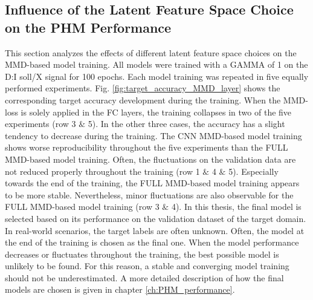 \subsection{Influence of the Latent Feature Space Choice on the PHM Performance}\label{ch:Influence_Layer_real_dataset}
This section analyzes the effects of different latent feature space choices on the MMD-based model training. All models were trained with a GAMMA of 1 on the D:I soll/X signal for 100 epochs. Each model training was repeated in five equally performed experiments. Fig. \ref{fig:target_accuracy_MMD_layer} shows the corresponding target accuracy development during the training. When the MMD-loss is solely applied in the FC layers, the training collapses in two of the five experiments (row 3 $\&$ 5). In the other three cases, the accuracy has a slight tendency to decrease during the training. The CNN MMD-based model training shows worse reproducibility throughout the five experiments than the FULL MMD-based model training. Often, the fluctuations on the validation data are not reduced properly throughout the training (row 1 $\&$ 4 $\&$ 5). Especially towards the end of the training, the FULL MMD-based model training appears to be more stable. Nevertheless, minor fluctuations are also observable for the FULL MMD-based model training (row 3 $\&$ 4). In this thesis, the final model is selected based on its performance on the validation dataset of the target domain. In real-world scenarios, the target labels are often unknown. Often, the model at the end of the training is chosen as the final one. When the model performance decreases or fluctuates throughout the training, the best possible model is unlikely to be found. For this reason, a stable and converging model training should not be underestimated. A more detailed description of how the final models are chosen is given in chapter \ref{ch:PHM_performance}. 

